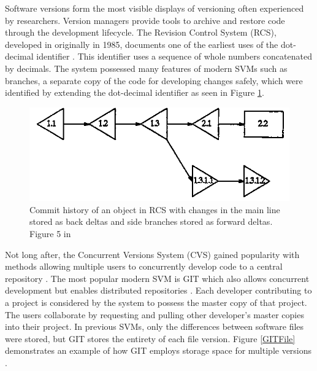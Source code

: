 Software versions form the most visible displays of versioning often experienced by researchers.
Version managers provide tools to archive and restore code through the development lifecycle.
The Revision Control System (RCS), developed in originally in 1985, documents one of the earliest uses of the dot-decimal identifier \cite{tichy1985rcs}.
This identifier uses a sequence of whole numbers concatenated by decimals.
The system possessed many features of modern SVMs such as branches, a separate copy of the code for developing changes safely, which were identified by extending the dot-decimal identifier as seen in Figure \ref{RCSTree}.
\begin{figure}
	\centering
	\includegraphics[scale=0.75]{figures/RCSCommitTree.png}
	\caption[Commit history of an object in RCS with changes in the main line stored as back deltas and side branches stored as forward deltas.]{Commit history of an object in RCS with changes in the main line stored as back deltas and side branches stored as forward deltas.  Figure 5 in \cite{tichy1985rcs}}
	\label{RCSTree}
\end{figure}
Not long after, the Concurrent Versions System (CVS) gained popularity with methods allowing multiple users to concurrently develop code to a central repository \cite{cederqvist2002version}.
The most popular modern SVM is GIT which also allows concurrent development but enables distributed repositories \cite{Chacon:2009:PG:1618548}.
Each developer contributing to a project is considered by the system to possess the master copy of that project.
The users collaborate by requesting and pulling other developer's master copies into their project.
In previous SVMs, only the differences between software files were stored, but GIT stores the entirety of each file version.
Figure \ref{GITFile} demonstrates an example of how GIT employs storage space for multiple versions \cite{Chacon:2009:PG:1618548}.
